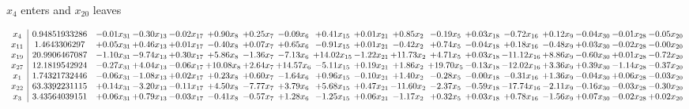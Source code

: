 \documentclass[9pt]{article}
\begin{document}
 $ x_{4} $ enters and $ x_{20} $ leaves 

 \[\begin{array}{c| c c@{\hskip 2pt} c@{\hskip 2pt} c@{\hskip 2pt} c@{\hskip 2pt} c@{\hskip 2pt} c@{\hskip 2pt} c@{\hskip 2pt} c@{\hskip 2pt} c@{\hskip 2pt} c@{\hskip 2pt} c@{\hskip 2pt} c@{\hskip 2pt} c@{\hskip 2pt} c@{\hskip 2pt} c@{\hskip 2pt} c@{\hskip 2pt} }
 x_{4}   &  0.94851933286 & -0.01 x_{31} & -0.30 x_{13} & -0.02 x_{17} & +  0.90 x_{8} & +  0.25 x_{7} & -0.09 x_{6} & +  0.41 x_{15} & +  0.01 x_{21} & +  0.85 x_{2} & -0.19 x_{5} & +  0.03 x_{18} & -0.72 x_{16} & +  0.12 x_{9} & -0.04 x_{30} & -0.01 x_{28} & -0.05 x_{20}\\
 x_{11}   &  1.4643306297 & +  0.05 x_{31} & +  0.46 x_{13} & +  0.01 x_{17} & -0.40 x_{8} & +  0.07 x_{7} & +  0.65 x_{6} & -0.91 x_{15} & +  0.01 x_{21} & -0.42 x_{2} & +  0.74 x_{5} & -0.04 x_{18} & +  0.18 x_{16} & -0.48 x_{9} & +  0.03 x_{30} & -0.02 x_{28} & -0.00 x_{20}\\
 x_{19}   &  20.9906467087 & -1.10 x_{31} & -9.74 x_{13} & +  0.30 x_{17} & +  5.86 x_{8} & -1.36 x_{7} & -7.13 x_{6} & + 14.02 x_{15} & -1.22 x_{21} & + 11.73 x_{2} & +  4.71 x_{5} & +  0.03 x_{18} & -11.12 x_{16} & +  8.86 x_{9} & -0.60 x_{30} & +  0.01 x_{28} & -0.72 x_{20}\\
 x_{27}   &  12.1819542924 & -0.27 x_{31} & +  4.04 x_{13} & -0.06 x_{17} & + 10.08 x_{8} & +  2.64 x_{7} & + 14.57 x_{6} & -5.11 x_{15} & +  0.19 x_{21} & +  1.86 x_{2} & + 19.70 x_{5} & -0.13 x_{18} & -12.02 x_{16} & +  3.36 x_{9} & +  0.39 x_{30} & -1.14 x_{28} & -0.37 x_{20}\\
 x_{1}   &  1.74321732446 & -0.06 x_{31} & -1.08 x_{13} & +  0.02 x_{17} & +  0.23 x_{8} & +  0.60 x_{7} & -1.64 x_{6} & +  0.96 x_{15} & -0.10 x_{21} & +  1.40 x_{2} & -0.28 x_{5} & -0.00 x_{18} & -0.31 x_{16} & +  1.36 x_{9} & -0.04 x_{30} & +  0.06 x_{28} & -0.03 x_{20}\\
 x_{22}   &  63.3392231115 & +  0.14 x_{31} & -3.20 x_{13} & -0.11 x_{17} & +  4.50 x_{8} & -7.77 x_{7} & +  3.79 x_{6} & +  5.68 x_{15} & +  0.47 x_{21} & -11.60 x_{2} & -2.37 x_{5} & -0.59 x_{18} & -17.74 x_{16} & -2.11 x_{9} & -0.16 x_{30} & -0.03 x_{28} & -0.30 x_{20}\\
 x_{3}   &  3.43564039151 & +  0.06 x_{31} & +  0.79 x_{13} & -0.03 x_{17} & -0.41 x_{8} & -0.57 x_{7} & +  1.28 x_{6} & -1.25 x_{15} & +  0.06 x_{21} & -1.17 x_{2} & +  0.32 x_{5} & +  0.03 x_{18} & +  0.78 x_{16} & -1.56 x_{9} & +  0.07 x_{30} & -0.02 x_{28} & +  0.02 x_{20}\\

\end{array}\]
\end{document}
